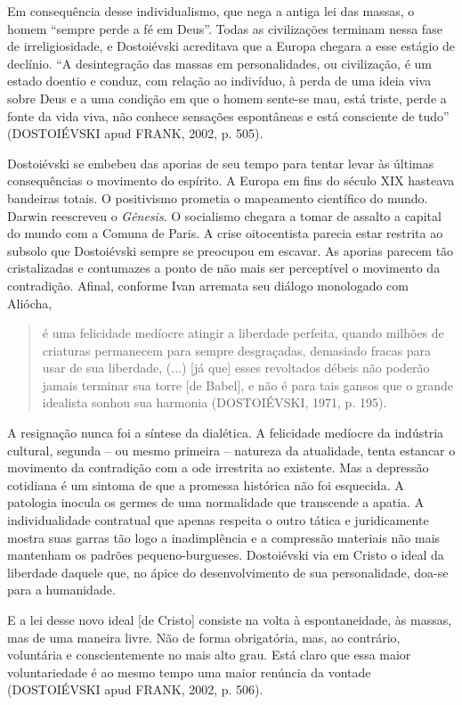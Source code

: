 Em consequência desse individualismo, que nega a antiga lei das massas,
o homem ``sempre perde a fé em Deus''. Todas as civilizações terminam
nessa fase de irreligiosidade, e Dostoiévski acreditava que a Europa
chegara a esse estágio de declínio. ``A desintegração das massas em
personalidades, ou civilização, é um estado doentio e conduz, com
relação ao indivíduo, à perda de uma ideia viva sobre Deus e a uma
condição em que o homem sente-se mau, está triste, perde a fonte da vida
viva, não conhece sensações espontâneas e está consciente de tudo''
(DOSTOIÉVSKI apud FRANK, 2002, p. 505).

Dostoiévski se embebeu das aporias de seu tempo para tentar levar às
últimas consequências o movimento do espírito. A Europa em fins do
século XIX hasteava bandeiras totais. O positivismo prometia o
mapeamento científico do mundo. Darwin reescreveu o \emph{Gênesis}. O
socialismo chegara a tomar de assalto a capital do mundo com a Comuna de
Paris. A crise oitocentista parecia estar restrita ao subsolo que
Dostoiévski sempre se preocupou em escavar. As aporias parecem tão
cristalizadas e contumazes a ponto de não mais ser perceptível o
movimento da contradição. Afinal, conforme Ivan arremata seu diálogo
monologado com Aliócha,

\begin{quote}
é uma felicidade medíocre atingir a liberdade perfeita, quando milhões
de criaturas permanecem para sempre desgraçadas, demasiado fracas para
usar de sua liberdade, (...) {[}já que{]} esses revoltados débeis não
poderão jamais terminar sua torre {[}de Babel{]}, e não é para tais
gansos que o grande idealista sonhou sua harmonia (DOSTOIÉVSKI, 1971, p.
195).
\end{quote}

A resignação nunca foi a síntese da dialética. A felicidade medíocre da
indústria cultural, segunda -- ou mesmo primeira -- natureza da
atualidade, tenta estancar o movimento da contradição com a ode
irrestrita ao existente. Mas a depressão cotidiana é um sintoma de que a
promessa histórica não foi esquecida. A patologia inocula os germes de
uma normalidade que transcende a apatia. A individualidade contratual
que apenas respeita o outro tática e juridicamente mostra suas garras
tão logo a inadimplência e a compressão materiais não mais mantenham os
padrões pequeno-burgueses. Dostoiévski via em Cristo o ideal da
liberdade daquele que, no ápice do desenvolvimento de sua personalidade,
doa-se para a humanidade.

E a lei desse novo ideal {[}de Cristo{]} consiste na volta à
espontaneidade, às massas, mas de uma maneira livre. Não de forma
obrigatória, mas, ao contrário, voluntária e conscientemente no mais
alto grau. Está claro que essa maior voluntariedade é ao mesmo tempo uma
maior renúncia da vontade (DOSTOIÉVSKI apud FRANK, 2002, p. 506).

